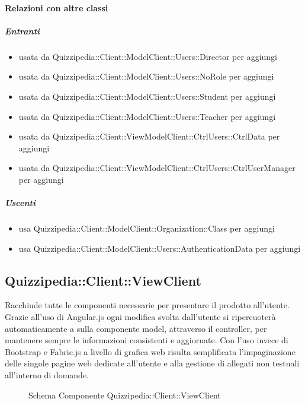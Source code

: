 \paragraph{Relazioni con altre classi}
\subparagraph{Entranti}
\begin{itemize}
\item usata da Quizzipedia::Client::ModelClient::Users::Director per aggiungi
\item usata da Quizzipedia::Client::ModelClient::Users::NoRole per aggiungi
\item usata da Quizzipedia::Client::ModelClient::Users::Student per aggiungi
\item usata da Quizzipedia::Client::ModelClient::Users::Teacher per aggiungi
\item usata da Quizzipedia::Client::ViewModelClient::CtrlUsers::CtrlData per aggiungi
\item usata da Quizzipedia::Client::ViewModelClient::CtrlUsers::CtrlUserManager per aggiungi
\end{itemize}
\subparagraph{Uscenti}
\begin{itemize}
\item usa Quizzipedia::Client::ModelClient::Organization::Class per aggiungi
\item usa Quizzipedia::Client::ModelClient::Users::AuthenticationData per aggiungi
\end{itemize}
\subsection{Quizzipedia::Client::ViewClient}
Racchiude tutte le componenti necessarie per presentare il prodotto all'utente.
Grazie all'uso di Angular.js ogni modifica svolta dall'utente si ripercuoterà automaticamente a sulla componente model, attraverso il controller, per mantenere sempre le informazioni consistenti e aggiornate.
Con l'uso invece di Bootstrap e Fabric.js a livello di grafica web risulta semplificata l'impaginazione delle singole pagine web dedicate all'utente e alla gestione di allegati non testuali all'interno di domande.
\begin{figure}[H]
\centering
\noindent{}
\caption[Schema Componente Quizzipedia::Client::ViewClient]{Schema Componente Quizzipedia::Client::ViewClient}
\end{figure}
